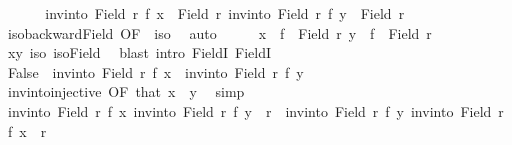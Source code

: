 \begin{isabellebody}
\ \ \isamarkupfalse%
\ \isamarkupfalse%
\ {\isasymsection}{\isacharcolon}{\kern0pt}\ {\isachardoublequoteopen}inv{\isacharunderscore}{\kern0pt}into\ {\isacharparenleft}{\kern0pt}Field\ r{\isacharparenright}{\kern0pt}\ f\ x\ {\isasymin}\ Field\ r{\isachardoublequoteclose}\ {\isachardoublequoteopen}inv{\isacharunderscore}{\kern0pt}into\ {\isacharparenleft}{\kern0pt}Field\ r{\isacharparenright}{\kern0pt}\ f\ y\ {\isasymin}\ Field\ r{\isachardoublequoteclose}\isanewline
\ \ \ \ \isamarkupfalse%
\ iso{\isacharunderscore}{\kern0pt}backward{\isacharunderscore}{\kern0pt}Field\ {\isacharbrackleft}{\kern0pt}OF\ {\isacharunderscore}{\kern0pt}\ iso{\isacharbrackright}{\kern0pt}\ \isamarkupfalse%
\ auto\isanewline
\ \ \isamarkupfalse%
\ \isamarkupfalse%
\ {\isachardoublequoteopen}x\ {\isasymin}\ f\ {\isacharbackquote}{\kern0pt}\ Field\ r{\isachardoublequoteclose}\ {\isachardoublequoteopen}y\ {\isasymin}\ f\ {\isacharbackquote}{\kern0pt}\ Field\ r{\isachardoublequoteclose}\isanewline
\ \ \ \ \isamarkupfalse%
\ xy\ iso\ iso{\isacharunderscore}{\kern0pt}Field\ \isamarkupfalse%
\ {\isacharparenleft}{\kern0pt}blast\ intro{\isacharcolon}{\kern0pt}\ FieldI{}\ FieldI{}{\isacharparenright}{\kern0pt}{\isacharplus}{\kern0pt}\isanewline
\ \ \isamarkupfalse%
\ \isamarkupfalse%
\ False\ \ {\isachardoublequoteopen}inv{\isacharunderscore}{\kern0pt}into\ {\isacharparenleft}{\kern0pt}Field\ r{\isacharparenright}{\kern0pt}\ f\ x\ {\isacharequal}{\kern0pt}\ inv{\isacharunderscore}{\kern0pt}into\ {\isacharparenleft}{\kern0pt}Field\ r{\isacharparenright}{\kern0pt}\ f\ y{\isachardoublequoteclose}\isanewline
\ \ \ \ \isamarkupfalse%
\ inv{\isacharunderscore}{\kern0pt}into{\isacharunderscore}{\kern0pt}injective\ {\isacharbrackleft}{\kern0pt}OF\ that{\isacharbrackright}{\kern0pt}\ {\isacartoucheopen}x\ {\isasymnoteq}\ y{\isacartoucheclose}\ \isamarkupfalse%
\ simp\isanewline
\ \ \isamarkupfalse%
\ \isamarkupfalse%
\ {\isachardoublequoteopen}{\isacharparenleft}{\kern0pt}inv{\isacharunderscore}{\kern0pt}into\ {\isacharparenleft}{\kern0pt}Field\ r{\isacharparenright}{\kern0pt}\ f\ x{\isacharcomma}{\kern0pt}\ inv{\isacharunderscore}{\kern0pt}into\ {\isacharparenleft}{\kern0pt}Field\ r{\isacharparenright}{\kern0pt}\ f\ y{\isacharparenright}{\kern0pt}\ {\isasymin}\ r\ {\isasymor}\ {\isacharparenleft}{\kern0pt}inv{\isacharunderscore}{\kern0pt}into\ {\isacharparenleft}{\kern0pt}Field\ r{\isacharparenright}{\kern0pt}\ f\ y{\isacharcomma}{\kern0pt}\ inv{\isacharunderscore}{\kern0pt}into\ {\isacharparenleft}{\kern0pt}Field\ r{\isacharparenright}{\kern0pt}\ f\ x{\isacharparenright}{\kern0pt}\ {\isasymin}\ r{\isachardoublequoteclose}\isanewline

\end{isabellebody}
